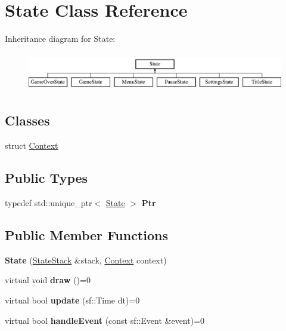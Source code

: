 \hypertarget{class_state}{}\section{State Class Reference}
\label{class_state}
Inheritance diagram for State\+:\begin{figure}[H]
\begin{center}
\leavevmode
\includegraphics[height=1.712538cm]{class_state}
\end{center}
\end{figure}
\subsection*{Classes}
\begin{DoxyCompactItemize}
\item 
struct \hyperlink{struct_state_1_1_context}{Context}
\end{DoxyCompactItemize}
\subsection*{Public Types}
\begin{DoxyCompactItemize}
\item 
\hypertarget{class_state_a71d9930be1a58be7f711e245b7965d48}{}typedef std\+::unique\+\_\+ptr$<$ \hyperlink{class_state}{State} $>$ {\bfseries Ptr}\label{class_state_a71d9930be1a58be7f711e245b7965d48}

\end{DoxyCompactItemize}
\subsection*{Public Member Functions}
\begin{DoxyCompactItemize}
\item 
\hypertarget{class_state_afede488ff3c1b264bbd07f8aeead84a7}{}{\bfseries State} (\hyperlink{class_state_stack}{State\+Stack} \&stack, \hyperlink{struct_state_1_1_context}{Context} context)\label{class_state_afede488ff3c1b264bbd07f8aeead84a7}

\item 
\hypertarget{class_state_ae261605bc40b7e3959ce5df5457e4942}{}virtual void {\bfseries draw} ()=0\label{class_state_ae261605bc40b7e3959ce5df5457e4942}

\item 
\hypertarget{class_state_acd5926bc7a373edff9e57f3ffe94ca13}{}virtual bool {\bfseries update} (sf\+::\+Time dt)=0\label{class_state_acd5926bc7a373edff9e57f3ffe94ca13}

\item 
\hypertarget{class_state_a19965f83460b248c42952aac8d001206}{}virtual bool {\bfseries handle\+Event} (const sf\+::\+Event \&event)=0\label{class_state_a19965f83460b248c42952aac8d001206}

\end{DoxyCompactItemize}
